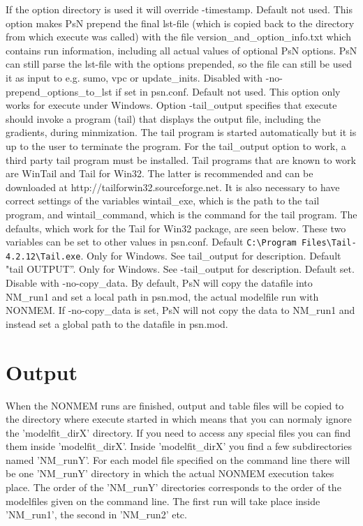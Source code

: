 \begin{optionlist}
If the option directory is used it will override -timestamp.
\nextopt
{}
Default not used. This option makes PsN prepend the final lst-file (which is copied back to the directory from which execute was called) with the file version\_and\_option\_info.txt which contains run information, including     all actual values of optional PsN options. PsN can still parse the lst-file with the options prepended, so the file can still be used it as input to e.g. sumo, vpc or update\_inits. Disabled with -no-prepend\_options\_to\_lst if set in psn.conf.
\nextopt
{}
Default not used. This option only works for execute under Windows. Option -tail\_output specifies that execute should invoke a program (tail) that displays the output file, including the gradients, during minmization. The tail program is started automatically but it is up to the user to terminate the program. For the tail\_output option to work, a third party tail program must be installed. Tail programs that are known to work are WinTail and Tail for Win32.  The latter is recommended and can be downloaded at http://tailforwin32.sourceforge.net. It is also necessary to have correct settings of the variables wintail\_exe, which is the path to the tail program, and wintail\_command, which is the command for the tail program. The defaults, which work for the Tail for Win32 package, are seen below. These two variables can be set to other values in psn.conf.
\nextopt
{}
Default \verb|C:\Program Files\Tail-4.2.12\Tail.exe|. Only for Windows. See tail\_output for description.
\nextopt
{}
Default "tail OUTPUT”. Only for Windows. See -tail\_output for description.
\nextopt
{}
Default set. Disable with -no-copy\_data. By default, PsN will copy the datafile into NM\_run1 and set a local path in psn.mod, the actual modelfile run with NONMEM. If -no-copy\_data is set, PsN will not copy the data to NM\_run1 and instead set a global path to the datafile in psn.mod.
\nextopt
\end{optionlist}

\section{Output}
When the NONMEM runs are finished, output and table files will be copied to the directory where execute started in which means that you can normaly ignore the 'modelfit\_dirX' directory. If you need to access any special files you can find them inside 'modelfit\_dirX'. Inside 'modelfit\_dirX' you find a few subdirectories named 'NM\_runY'. For each model file specified on the command line there will be one 'NM\_runY' directory in which the actual NONMEM execution takes place. The order of the 'NM\_runY' directories corresponds to the order of the modelfiles given on the command line. The first run will take place inside 'NM\_run1', the second in 'NM\_run2' etc.




